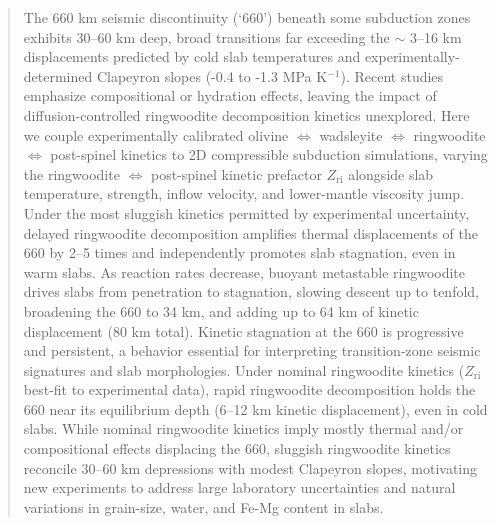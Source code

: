 \documentclass[draft,linenumbers]{agujournal2019}
\begin{document}
\begin{abstract}
The 660 km seismic discontinuity (`660') beneath some subduction zones
exhibits 30--60 km deep, broad transitions far exceeding the \(\sim\)
3--16 km displacements predicted by cold slab temperatures and
experimentally-determined Clapeyron slopes (-0.4 to -1.3 MPa
K\(^{-1}\)). Recent studies emphasize compositional or hydration
effects, leaving the impact of diffusion-controlled ringwoodite
decomposition kinetics unexplored. Here we couple experimentally
calibrated olivine \(\Leftrightarrow\) wadsleyite \(\Leftrightarrow\)
ringwoodite \(\Leftrightarrow\) post-spinel kinetics to 2D compressible
subduction simulations, varying the ringwoodite \(\Leftrightarrow\)
post-spinel kinetic prefactor \(Z_\mathrm{ri}\) alongside slab
temperature, strength, inflow velocity, and lower-mantle viscosity jump.
Under the most sluggish kinetics permitted by experimental uncertainty,
delayed ringwoodite decomposition amplifies thermal displacements of the
660 by 2--5 times and independently promotes slab stagnation, even in
warm slabs. As reaction rates decrease, buoyant metastable ringwoodite
drives slabs from penetration to stagnation, slowing descent up to
tenfold, broadening the 660 to 34 km, and adding up to 64 km of kinetic
displacement (80 km total). Kinetic stagnation at the 660 is progressive
and persistent, a behavior essential for interpreting transition-zone
seismic signatures and slab morphologies. Under nominal ringwoodite
kinetics (\(Z_\mathrm{ri}\) best-fit to experimental data), rapid
ringwoodite decomposition holds the 660 near its equilibrium depth
(6--12 km kinetic displacement), even in cold slabs. While nominal
ringwoodite kinetics imply mostly thermal and/or compositional effects
displacing the 660, sluggish ringwoodite kinetics reconcile 30--60 km
depressions with modest Clapeyron slopes, motivating new experiments to
address large laboratory uncertainties and natural variations in
grain-size, water, and Fe-Mg content in slabs.
\end{abstract}
\end{document}
